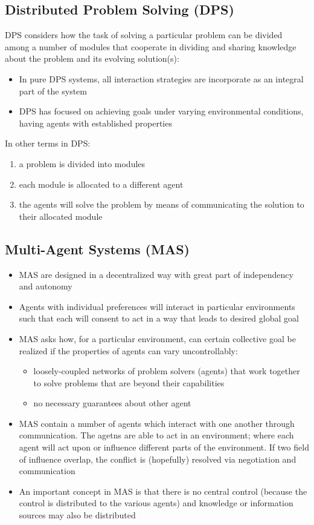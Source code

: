 \subsection{Distributed Problem Solving (DPS)}
DPS considers how the task of solving a particular problem can be divided among a number of modules that cooperate in dividing and sharing knowledge about the problem and its evolving solution(s):
\begin{itemize}
\item In pure DPS systems, all interaction strategies are incorporate as an integral part of the system
\item DPS has focused on achieving goals under varying environmental conditions, having agents with established properties
\end{itemize}

In other terms in DPS:
\begin{enumerate}
\item a problem is divided into modules 
\item each module is allocated to a different agent
\item the agents will solve the problem by means of communicating the solution to their allocated module
\end{enumerate}

\subsection{Multi-Agent Systems (MAS)}
\begin{itemize}
\item MAS are designed in a decentralized way with great part of independency and autonomy
\item Agents with individual preferences will interact in particular environments such that each will consent to act in a way that leads to desired global goal
\item MAS asks how, for a particular environment, can certain collective goal be realized if the properties of agents can vary uncontrollably:
\begin{itemize}
\item loosely-coupled networks of problem solvers (agents) that work together to solve problems that are beyond their capabilities
\item no necessary guarantees about other agent
\end{itemize}
\item MAS contain a number of agents which interact with one another through communication. The agetns are able to act in an environment; where each agent will act upon or influence different parts of the environment. If two field of influence overlap, the conflict is (hopefully) resolved via negotiation and communication
\missingfigure{}
\item An important concept in MAS is that there is no central control (because the control is distributed to the various agents) and knowledge or information sources may also be distributed
\end{itemize}

